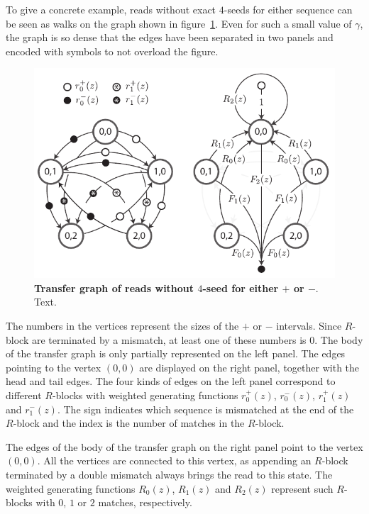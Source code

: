 \documentclass{article}
\begin{document}
To give a concrete example, reads without exact $4$-seeds for either
sequence can be seen as walks on the graph shown in
figure~\ref{fig:graph_fp}. Even for such a small value of $\gamma$, the
graph is so dense that the edges have been separated in two panels and
encoded with symbols to not overload the figure.

\begin{figure}[h]
\centering
\includegraphics[scale=1]{false_positives_graph.pdf}
\caption{\textbf{Transfer graph of reads without $4$-seed for either
$+$ or $-$}. Text.}
\label{fig:graph_fp}
\end{figure}

The numbers in the vertices represent the sizes of the $+$ or $-$
intervals. Since $R$-block are terminated by a mismatch, at least one of
these numbers is $0$. The body of the transfer graph is only partially
represented on the left panel. The edges pointing to the vertex $(0,0)$
are displayed on the right panel, together with the head and tail edges.
The four kinds of edges on the left panel correspond to different
$R$-blocks with weighted generating functions $r_0^+(z)$, $r_0^-(z)$,
$r_1^+(z)$ and $r_1^-(z)$. The sign indicates which sequence is mismatched
at the end of the $R$-block and the index is the number of matches in the
$R$-block.

The edges of the body of the transfer graph on the right panel point to
the vertex $(0,0)$. All the vertices are connected to this vertex, as
appending an $R$-block terminated by a double mismatch always brings the
read to this state. The weighted generating functions $R_0(z)$, $R_1(z)$
and $R_2(z)$ represent such $R$-blocks with $0$, $1$ or $2$ matches,
respectively.
\end{document}
